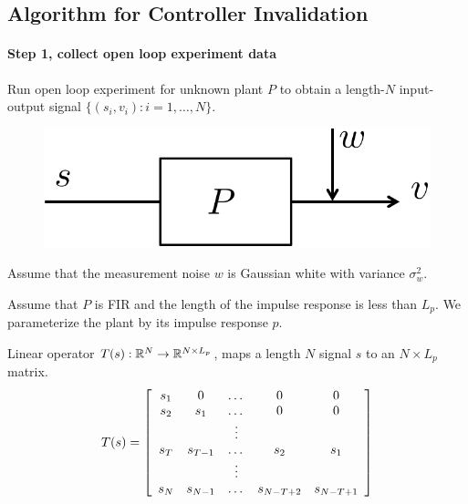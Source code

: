 \documentclass[11pt, onecolumn]{article}
\theoremstyle{plain}
\theoremstyle{plain}
\theoremstyle{definition}
\begin{document}
\subsection{Algorithm for Controller Invalidation}

\paragraph{Step 1,  collect open loop experiment data}
Run open loop experiment for unknown plant $P$ to obtain a length-$N$ input-output signal $\{(s_i,v_i) :
i=1,\dots, N\}$.
\begin{figure}[!ht]
  \centering
  \includegraphics[width=.3\linewidth]{sys3.pdf}
\end{figure}

\begin{assumption}
  Assume that the measurement noise $w$ is Gaussian white with variance $\sigma_w^2$.
\end{assumption}

\begin{assumption}
  Assume that $P$ is FIR and the length of the impulse response is less than $L_p$. We parameterize
  the plant by its impulse response $p$.
\end{assumption}


\begin{definition}
  Linear operator $T(s): \mathbb R^N\to \mathbb R^{N\times L_p}$, maps a length $N$ signal $s$ to an $N\times L_p$
  matrix.
  \begin{align*}
    T(s) = \left[
    \begin{array}[c]{ccccc}
      s_1 & 0 &\dots & 0  & 0
      \\
      s_2 & s_1 & \dots  & 0  & 0
      \\
      & & \vdots & &
      \\
      s_{T} & s_{T-1} & \dots & s_{2} & s_{1}
      \\
      & & \vdots & &
      \\
      s_N & s_{N-1} & \dots & s_{N-T+2} & s_{N-T+1}
    \end{array}
\right]
  \end{align*}

\end{definition}
\end{document}

